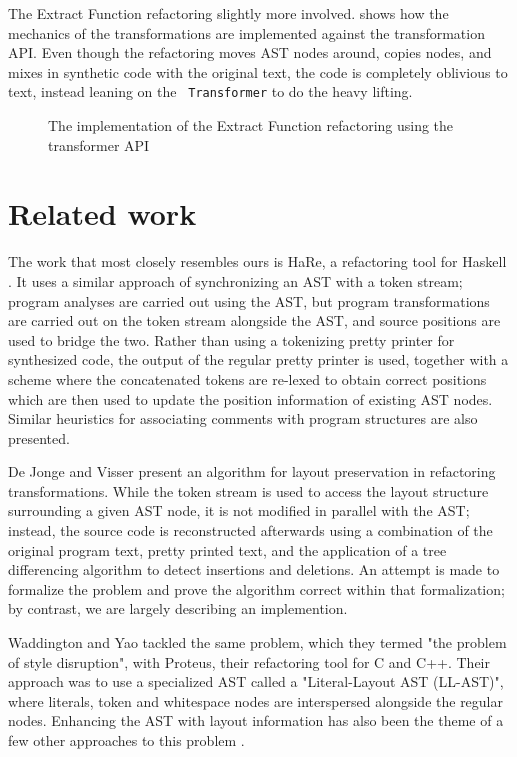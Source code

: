 The Extract Function refactoring slightly more involved.
 shows how the mechanics of the transformations are
implemented against the transformation API. Even though the refactoring moves
AST nodes around, copies nodes, and mixes in synthetic code with the original
text, the code is completely oblivious to text, instead leaning on the {\tt
Transformer} to do the heavy lifting.

\begin{figure}

\caption{The implementation of the Extract Function refactoring using the transformer API}
\label{Fig:ExtractFunction}
\end{figure}

\section{Related work}

The work that most closely resembles ours is HaRe, a refactoring tool for
Haskell \cite{HaRe}. It uses a similar approach of synchronizing an AST with a
token stream; program analyses are carried out using the AST, but program
transformations are carried out on the token stream alongside the AST, and
source positions are used to bridge the two. Rather than using a tokenizing
pretty printer for synthesized code, the output of the regular pretty printer
is used, together with a scheme where the concatenated tokens are re-lexed to
obtain correct positions which are then used to update the position information
of existing AST nodes. Similar heuristics for associating comments with program
structures are also presented.

De Jonge and Visser \cite{AlgorithmForLayoutPreservation} present an algorithm
for layout preservation in refactoring transformations. While the token stream
is used to access the layout structure surrounding a given AST node, it is not
modified in parallel with the AST; instead, the source code is reconstructed
afterwards using a combination of the original program text, pretty printed
text, and the application of a tree differencing algorithm to detect insertions
and deletions. An attempt is made to formalize the problem and prove the
algorithm correct within that formalization; by contrast, we are largely
describing an implemention.

Waddington and Yao \cite{Proteus} tackled the same problem, which they termed
"the problem of style disruption", with Proteus, their refactoring tool for C
and C++. Their approach was to use a specialized AST called a "Literal-Layout
AST (LL-AST)", where literals, token and whitespace nodes are interspersed
alongside the regular nodes. Enhancing the AST with layout information has also
been the theme of a few other approaches to this problem \cite{RefactorErl}.

